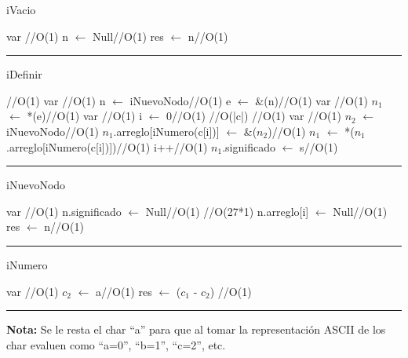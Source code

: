 \begin{algorithm}[H]
\caption{iVacio}
\begin{algorithmic}[1]
\State var \hfill //O(1)
\State n $\gets$ Null\hfill //O(1)
\State res $\gets$ n\hfill //O(1)
\EndFunction 
\end{algorithmic}
\hrule
{}
\end{algorithm}

\begin{algorithm}[H]
\caption{iDefinir}
\begin{algorithmic}[1]
\hfill //O(1)
\state var \hfill //O(1)
\state n $\gets$ iNuevoNodo\hfill //O(1)
\state e $\gets$ \&(n)\hfill //O(1)
\EndIf
\State var \hfill //O(1)
\State $n_1$ $\gets$ *(e)\hfill //O(1)
\state var \hfill //O(1)
\state i $\gets$ 0\hfill //O(1)
\hfill //O(|c|)
\hfill //O(1)
\State var \hfill //O(1)
\state $n_2$ $\gets$ iNuevoNodo\hfill //O(1)
\state $n_1$.arreglo[iNumero(c[i])] $\gets$ \&($n_2$)\hfill //O(1) 
\EndIf
\state $n_1$ $\gets$ *($n_1$.arreglo[iNumero(c[i])])\hfill //O(1)
\state i++\hfill //O(1)
\EndWhile
\state $n_1$.significado $\gets$ s\hfill //O(1)
\EndFunction 
\end{algorithmic}
\hrule
{}
\end{algorithm}


\begin{algorithm}[H]
\caption{iNuevoNodo}
\begin{algorithmic}[1]
\State var \hfill //O(1)
\State n.significado $\gets$ Null\hfill //O(1)
\hfill //O(27*1)
\State n.arreglo[i] $\gets$ Null\hfill //O(1)
\EndFor
\State res $\gets$ n\hfill //O(1)
\EndFunction 
\end{algorithmic}
\hrule
{}
\end{algorithm}


\begin{algorithm}[H]
\caption{iNumero}
\begin{algorithmic}[1]
\state var \hfill //O(1)
\state $c_2$ $\gets$ a\hfill //O(1)
\State res $\gets$ ($c_1$ - $c_2$)  \hfill //O(1)
\EndFunction 
\end{algorithmic}
\hrule
{}
\par \textbf{Nota:} Se le resta el char ``a'' para que al tomar la representación ASCII de los char evaluen como ``a=0'', ``b=1'', ``c=2'', etc. 
\end{algorithm}


